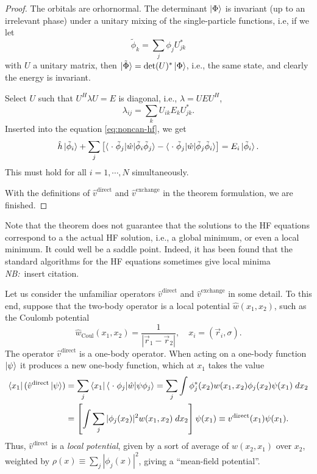 \documentclass{report}
\theoremstyle{plain}
\theoremstyle{definition}
\newcommand{\note}[1]{{\color{red}\emph{NB:}~#1}}
\begin{document}
\begin{proof}
  The orbitals are orhornormal. The determinant $\ket{\Phi}$ is
  invariant (up to an irrelevant phase) under a unitary mixing of the
  single-particle functions, i.e, if we let
  \begin{equation}
    \tilde{\phi}_k = \sum_j \phi_j U^*_{jk}
  \end{equation}
  with $U$ a unitary matrix, then
  $\ket{\tilde{\Phi}}=\det(U)^*\ket{\Phi}$, i.e., the same state, and
  clearly the energy is invariant.

  Select $U$ such that $U^H \lambda U = E$ is diagonal, i.e., $\lambda
  = U E U^H$,
  \begin{equation}
    \lambda_{ij} = \sum_k U_{ik} E_k U^*_{jk}.
  \end{equation}
  Inserted into the equation \eqref{eq:noncan-hf}, we get
  \begin{equation}
    \hat{h}\ket{\tilde{\phi}_i} + \sum_{j}\left[
    \braket{\;\cdot\; \tilde{\phi}_j|\hat{w}|\tilde{\phi}_i\tilde{\phi}_j} - \braket{\;\cdot\;\tilde{\phi}_j|\hat{w}|\tilde{\phi}_j \tilde{\phi}_i}\right] =
    E_i \ket{\tilde{\phi}_i}.\label{eq:noncan-hf}
  \end{equation}
  This must hold for all $i=1,\cdots,N$ simultaneously.
  
  With the definitions of $\hat{v}^\text{direct}$ and
  $\hat{v}^\text{exchange}$ in the theorem formulation, we are
  finished.
\end{proof}

Note that the theorem does not guarantee that the solutions to the HF
equations correspond to a the actual HF solution, i.e., a global
minimum, or even a local minimum. It could well be a saddle
point. Indeed, it has been found that the standard algorithms for the
HF equations sometimes give local minima \note{insert citation}.

Let us consider the unfamiliar operators $\hat{v}^\text{direct}$ and
$\hat{v}^\text{exchange}$ in some detail. To this end, suppose that
the two-body operator is a local potential $\hat{w}(x_1,x_2)$, such as
the Coulomb potential
\begin{equation}
  \hat{w}_\text{Coul}(x_1,x_2) = \frac{1}{|\vec{r}_1 - \vec{r}_2|},
  \quad x_i = (\vec{r}_i,\sigma).
\end{equation}
The operator $\hat{v}^\text{direct}$ is a one-body operator. When
acting on a one-body function $\ket{\psi}$ it produces a new one-body
function, which at $x_1$ takes the value
\begin{equation}
  \begin{split}
    \bra{x_1}(\hat{v}^\text{direct}\ket{\psi}) &=
  \sum_j \bra{x_1}\braket{\;\cdot\; \phi_j|\hat{w}|\psi\phi_j} =
  \sum_j \int \phi_j^*(x_2) w(x_1,x_2) \phi_j(x_2) \psi(x_1) \; dx_2
  \\ &
  = \left[ \int \sum_j |\phi_j(x_2)|^2 w(x_1,x_2) \; dx_2\right] \psi(x_1)
  \equiv v^\text{direct}(x_1)\psi(x_1).
\end{split}
\end{equation}
Thus, $\hat{v}^\text{direct}$ is a \emph{local potential}, given by a
sort of average of $w(x_2,x_1)$ over $x_2$, weighted by $\rho(x)
\equiv \sum_j |\phi_j(x)|^2$, giving a
``mean-field potential''.
\end{document}

